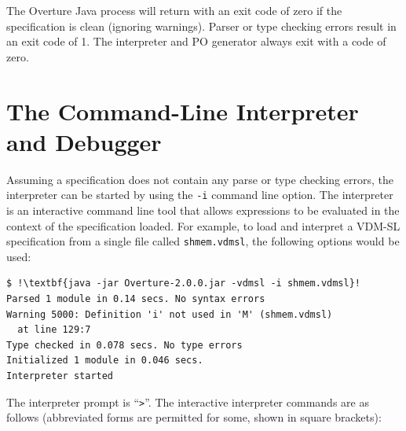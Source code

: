 \documentclass{overturerepchap}
\begin{document}
The Overture Java process will return with an exit code of zero if the
specification is clean (ignoring warnings). Parser or type checking
errors result in an exit code of 1. The interpreter and PO generator
always exit with a code of zero.

\section{The Command-Line Interpreter and Debugger}\label{sec:commandlineinterpreter}

Assuming a specification does not contain any parse or type checking errors, the interpreter can be
started by using the \texttt{-i} command line option.
The interpreter is an interactive command line tool that allows expressions to be evaluated in the
context of the specification loaded. For example, to load and interpret a
VDM-SL specification from a single file called \texttt{shmem.vdmsl},
the following options would be used:

\begin{lstlisting}
$ !\textbf{java -jar Overture-2.0.0.jar -vdmsl -i shmem.vdmsl}!
Parsed 1 module in 0.14 secs. No syntax errors
Warning 5000: Definition 'i' not used in 'M' (shmem.vdmsl) 
  at line 129:7
Type checked in 0.078 secs. No type errors
Initialized 1 module in 0.046 secs.
Interpreter started
\end{lstlisting}

The interpreter prompt is ``\texttt{>}''. The
interactive interpreter commands are as follows (abbreviated forms are
permitted for some, shown in square brackets):
\end{document}
